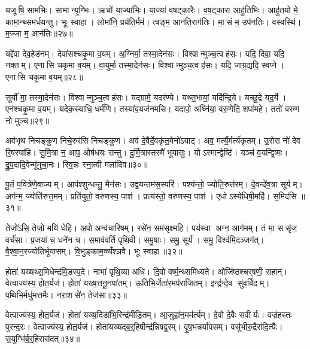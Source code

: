 यजूषि॒ साम॑भिः। सामान्यृ॒ग्भिः। ऋचो॑ या॒ज्या॑भिः। या॒ज्या॑ वषट्का॒रैः। व॒ष॒ट्का॒रा आहु॑तिभिः। आहु॑तयो मे॒ कामा॒न्थ्सम॑र्धयन्तु। भूः स्वाहा। लोमा॑नि॒ प्रय॑ति॒र्मम॑। त्वङ्म॒ आन॑ति॒राग॑तिः। मा॒सं म॒ उप॑नतिः। वस्वस्थि॑। म॒ज्जा म॒ आन॑तिः॥२७॥\anuvakamend[प॒स्त्यास्वा सर॑स्वत्यै॒ भैष॑ज्येन॒ श्रीरङ्गा॑नि भ॒सद्य॒ज्ञे य॒ज्ञो यजु॑र्भि॒रुप॑नति॒र्द्वे च॑]

यद्दे॑वा देव॒हेड॑नम्। देवा॑सश्चकृ॒मा व॒यम्। अ॒ग्निर्मा॒ तस्मा॒देन॑सः। विश्वान्मुञ्च॒त्वह॑सः। यदि॒ दिवा॒ यदि॒ नक्तम्। एनासि चकृ॒मा व॒यम्। वा॒युर्मा॒ तस्मा॒देन॑सः। विश्वान्मुञ्च॒त्वह॑सः। यदि॒ जाग्र॒द्यदि॒ स्वप्ने। एनासि चकृ॒मा व॒यम्॥२८॥

सूर्यो॑ मा॒ तस्मा॒देन॑सः। विश्वान्मुञ्च॒त्वह॑सः। यद्ग्रामे॒ यदर॑ण्ये। यथ्स॒भायां॒ यदि॑न्द्रि॒ये। यच्छू॒द्रे यद॒र्ये। एन॑श्चकृ॒मा व॒यम्। यदेक॒स्याधि॒ धर्म॑णि। तस्या॑व॒यज॑नमसि। यदापो॒ अघ्नि॑या॒ वरु॒णेति॒ शपा॑महे। ततो॑ वरुण नो मुञ्च॥२९॥

अव॑भृथ निचङ्कुण निचे॒रुर॑सि निचङ्कुण। अव॑ दे॒वैर्दे॒वकृ॑त॒मेनो॑ऽयाट्। अव॒ मर्त्यै॒र्मर्त्य॑कृतम्। उ॒रोरा नो॑ देव रि॒षस्पा॑हि। सु॒मि॒त्रा न॒ आप॒ ओष॑धयः सन्तु। दु॒र्मि॒त्रास्तस्मै॑ भूयासुः। योऽस्मान्द्वेष्टि॑। यञ्च॑ व॒यन्द्वि॒ष्मः। द्रु॒प॒दादि॒वेन्मु॑मुचा॒नः। स्वि॒न्नः स्ना॒त्वी मला॑दिव॥३०॥

पू॒तं प॒वित्रे॑णे॒वाज्यम्। आप॑श्शुन्धन्तु॒ मैन॑सः। उद्व॒यन्तम॑स॒स्परि॑। पश्य॑न्तो॒ ज्योति॒रुत्त॑रम्। दे॒वन्दे॑व॒त्रा सूर्यम्। अग॑न्म॒ ज्योति॑रुत्त॒मम्। प्रति॑युतो॒ वरु॑णस्य॒ पाश॑। प्रत्य॑स्तो॒ वरु॑णस्य॒ पाश॑। एधोऽस्येधिषी॒महि॑। स॒मिद॑सि ॥३१॥

तेजो॑ऽसि॒ तेजो॒ मयि॑ धेहि। अ॒पो अन्व॑चारिषम्। रसे॑न॒ सम॑सृक्ष्महि। पय॑स्वा अग्न॒ आग॑मम्। तं मा॒ ससृ॑ज॒ वर्च॑सा। प्र॒जया॑ च॒ धने॑न च। स॒माव॑वर्ति पृथि॒वी। समु॒षाः। समु॒ सूर्य॑। समु॒ विश्व॑मि॒दञ्जग॑त्। वै॒श्वा॒न॒रज्यो॑तिर्भूयासम्। वि॒भुङ्काम॒व्व्यँ॑श्ञवै। भूः स्वाहा॥३२॥\anuvakamend[स्वप्न॒ एनासि चकृ॒मा व॒यं मु॑ञ्च॒ मला॑दिव स॒मिद॑सि॒ जग॒त्रीणि॑ च]

होता॑ यख्षथ्स॒मिधेन्द्र॑मि॒डस्प॒दे। नाभा॑ पृथि॒व्या अधि॑। दि॒वो वर्ष्म॒न्थ्समि॑ध्यते। ओजि॑ष्ठश्चर्‌षणी॒ सहान्॑। वेत्वाज्य॑स्य॒ होत॒र्यज॑। होता॑ यख्ष॒त्तनू॒नपा॑तम्। ऊ॒तिभि॒र्जेता॑र॒मप॑राजितम्। इन्द्र॑न्दे॒व सु॑व॒र्विदम्। प॒थिभि॒र्मधु॑मत्तमैः। नरा॒शसे॑न॒ तेज॑सा॥३३॥

वेत्वाज्य॑स्य॒ होत॒र्यज॑। होता॑ यख्ष॒दिडा॑भि॒रिन्द्र॑मीडि॒तम्। आ॒जुह्वा॑न॒मम॑र्त्यम्। दे॒वो दे॒वैः सवीर्यः। वज्र॑हस्तः पुरन्द॒रः। वेत्वाज्य॑स्य॒ होत॒र्यज॑। होता॑यख्षद्ब॒र्॒हिषीन्द्र॑न्निषद्व॒रम्। वृ॒ष॒भन्नर्या॑पसम्। वसु॑भीरु॒द्रैरा॑दि॒त्यैः। स॒युग्भि॑र्ब॒र्॒हिरास॑दत्॥३४॥

